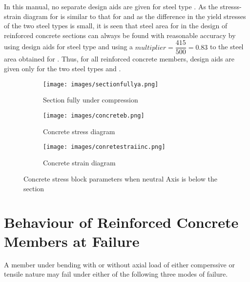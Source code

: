 In this manual, no separate design aids are given
for steel type {\fefivezerozero}. As the stresss-strain diagram for
{\fefivezerozero} is similar to that for {\fefouronefive} and as the
difference in the yield stresses of the two steel types is small, it
is seen that steel area for {\fefivezerozero}  in the design of
reinforced concrete sections can always be found with reasonable
accuracy by using design aids for steel type {\fefouronefive} and using
a $multiplier=\dfrac{415}{500} = 0.83$ to the steel area obtained for
{\fefouronefive}. Thus, for all reinforced concrete members, design aids
are given only for the two steel types {\fetwofivezero} and {\fefouronefive}.
\begin{figure}
\centering
\begin{subfigure}{0.3\textwidth}
\centering
\texttt{[image: images/sectionfullya.png]}
\caption{Section fully under compression}
\label{fig:section}
\end{subfigure}
%
\begin{subfigure}{0.3\textwidth}
\centering
\texttt{[image: images/concreteb.png]}
\caption{Concrete stress diagram}
\label{fig:sec}
\end{subfigure}
%
\begin{subfigure}{0.3\textwidth}
\centering
\texttt{[image: images/conretestraiinc.png]}
\caption{Concrete strain diagram}
\label{fig:con}
\end{subfigure}
\caption{Concrete stress block parameters when neutral Axis is below the section}
\label{fig:neutralAxis}
\end{figure}
\section{Behaviour of Reinforced Concrete Members at Failure}
A member under bending with or without axial load of either comperssive
or tensile nature may fail under either of the following three modes of
failure.

